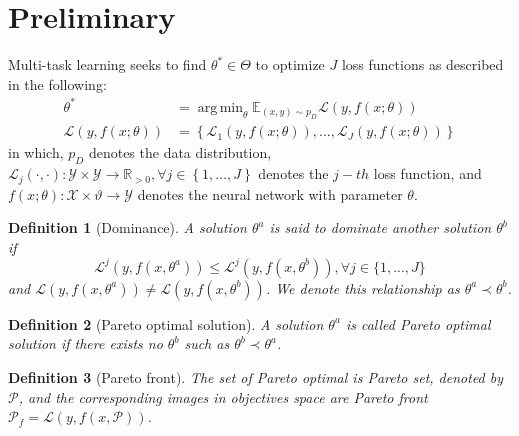 \documentclass[letterpaper]{article} %
\newtheorem{definition}{Definition}
\DeclareMathOperator*{\argmin}{arg\,min}
\begin{document}
\section{Preliminary}
\label{st:2}
Multi-task learning seeks to find $\theta^* \in \Theta$ to optimize $J$ loss functions as described in the following:
\begin{align}
\theta^* &= \argmin_{\theta} \mathbb{E}_{(x, y) \sim p_D} \mathcal{L}\left(y, f\left(x; \theta \right)\right)\\
\mathcal{L}\left(y, f\left(x; \theta \right)\right) &=\left\{ \mathcal{L}_1\left(y, f\left(x; \theta \right)\right),
\nonumber
\dots,
\mathcal{L}_J\left(y, f\left(x; \theta \right)\right) \right\}
\end{align}
in which, $p_D$ denotes the data distribution,  $\mathcal{L}_j\left(\cdot, \cdot \right):
\mathcal{Y} \times \mathcal{Y} \rightarrow \mathbb{R}_{>0}, \forall j \in
\left\{1, \dots, J\right\}$ denotes the $j-th$ loss function, and $f\left(x; \theta \right): \mathcal{X} \times \vartheta \rightarrow \mathcal{Y}$ denotes the neural network with parameter $\theta$.

\begin{definition}[Dominance] A solution $\theta^a$ is said to dominate another solution $\theta^b$ if $$\mathcal{L}^j(y, f(x, \theta^a)) \leq \mathcal{L}^j(y, f(x, \theta^b)), \forall j \in \{1,...,J\}$$ and $\mathcal{L}(y, f(x, \theta^a)) \neq \mathcal{L}(y, f(x, \theta^b))$. We denote this relationship as $\theta^a \prec \theta^b$.
\label{def:paretodominance}
\end{definition}

\begin{definition}[Pareto optimal solution] A solution $\theta^a$ is called Pareto optimal solution if there exists no $\theta^b$ such as $\theta^b \prec \theta^a$.
\label{def:paretooptimality}
\end{definition}

\begin{definition}[Pareto front] The set of Pareto optimal is Pareto set, denoted by $\mathcal{P}$, and the corresponding images in objectives space are Pareto front $\mathcal{P}_f=\mathcal{L}(y, f(x, \mathcal{P}))$.
\end{definition}
\end{document}
